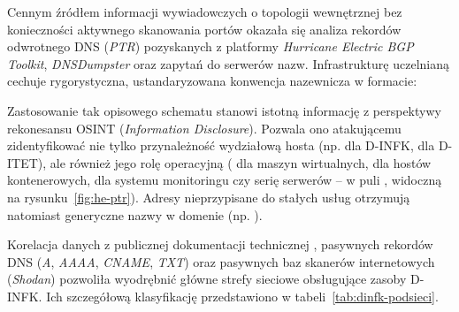 
Cennym źródłem informacji wywiadowczych o topologii wewnętrznej bez konieczności aktywnego skanowania portów okazała się analiza rekordów odwrotnego DNS (\textit{PTR}) pozyskanych z platformy \textit{Hurricane Electric BGP Toolkit}, \textit{DNSDumpster} oraz zapytań do serwerów nazw. Infrastrukturę uczelnianą cechuje rygorystyczna, ustandaryzowana konwencja nazewnicza w formacie:
\begin{center}
\end{center}
Zastosowanie tak opisowego schematu stanowi istotną informację z perspektywy rekonesansu OSINT (\textit{Information Disclosure}). Pozwala ono atakującemu zidentyfikować nie tylko przynależność wydziałową hosta (np.  dla D-INFK,  dla D-ITET), ale również jego rolę operacyjną ( dla maszyn wirtualnych,  dla hostów kontenerowych,  dla systemu monitoringu czy serię serwerów -- w puli , widoczną na rysunku~\ref{fig:he-ptr}). Adresy nieprzypisane do stałych usług otrzymują natomiast generyczne nazwy w domenie  (np. ).



Korelacja danych z publicznej dokumentacji technicznej , pasywnych rekordów DNS (\textit{A}, \textit{AAAA}, \textit{CNAME}, \textit{TXT}) oraz pasywnych baz skanerów internetowych (\textit{Shodan}) pozwoliła wyodrębnić główne strefy sieciowe obsługujące zasoby D-INFK. Ich szczegółową klasyfikację przedstawiono w tabeli~\ref{tab:dinfk-podsieci}.

